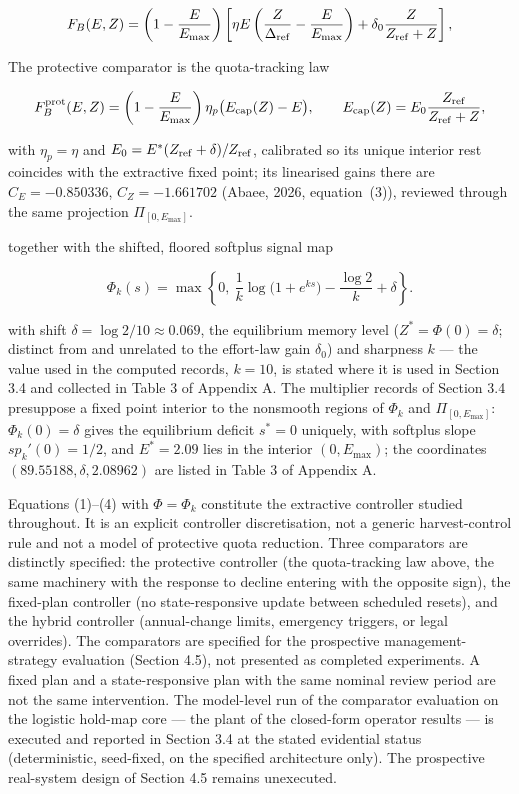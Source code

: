 \documentclass[11pt]{article}
\begin{document}
\[
F_B(E,Z)=\left(1-\frac{E}{E_{\max}}\right)
\left[
\eta E\left(\frac{Z}{\Delta_{\rm ref}}-\frac{E}{E_{\max}}\right)
+\delta_0\frac{Z}{Z_{\rm ref}+Z}
\right],
\]

The protective comparator is the quota-tracking law

\[
F_B^{\rm prot}(E,Z)=\left(1-\frac{E}{E_{\max}}\right)
\eta_p\bigl(E_{\rm cap}(Z)-E\bigr),
\qquad
E_{\rm cap}(Z)=E_0\frac{Z_{\rm ref}}{Z_{\rm ref}+Z},
\]

with \(\eta_p = \eta\) and \(E_0 = E^*(Z_{\rm ref}+\delta)/Z_{\rm ref}\), calibrated so its unique interior rest coincides with the extractive fixed point; its linearised gains there are \(C_E = -0.850336\), \(C_Z = -1.661702\) (Abaee, 2026, equation~(3)), reviewed through the same projection \(\Pi_{[0,E_{\max}]}\).

together with the shifted, floored softplus signal map

\[
\Phi_k(s)=\max\left\{0,\ \frac{1}{k}\log\!\bigl(1+e^{ks}\bigr)-\frac{\log 2}{k}+\delta\right\}.
\]

with shift \(\delta = \log 2/10 \approx 0.069\), the equilibrium memory level (\(Z^* = \Phi(0) = \delta\); distinct from
and unrelated to the effort-law gain \(\delta_0\)) and sharpness \(k\)
--- the value used in the computed records, \(k = 10\), is stated where it is used in Section 3.4 and collected in Table 3 of Appendix A. The
multiplier records of Section 3.4 presuppose a fixed point interior to
the nonsmooth regions of \(\Phi_k\) and \(\Pi_{[0,E_{\max}]}\):
\(\Phi_k(0) = \delta\) gives the equilibrium deficit \(s^* = 0\)
uniquely, with softplus slope \(sp_k'(0) = 1/2\), and \(E^* = 2.09\)
lies in the interior \((0, E_{\max})\); the coordinates
\((89.55188, \delta, 2.08962)\) are listed in Table 3 of Appendix A.

Equations (1)--(4) with \(\Phi=\Phi_k\) constitute the extractive
controller studied throughout. It is an explicit controller
discretisation, not a generic harvest-control rule and not a model of
protective quota reduction. Three comparators are distinctly specified: the protective controller (the quota-tracking law above, the same machinery with the
response to decline entering with the opposite sign), the fixed-plan
controller (no state-responsive update between scheduled resets), and
the hybrid controller (annual-change limits, emergency triggers, or
legal overrides). The comparators are specified for the prospective
management-strategy evaluation (Section 4.5), not presented as completed
experiments. A fixed plan and a state-responsive plan with the same
nominal review period are not the same intervention. The model-level run
of the comparator evaluation on the logistic hold-map core --- the plant
of the closed-form operator results --- is executed and reported in
Section 3.4 at the stated evidential status (deterministic,
seed-fixed, on the specified architecture only). The prospective
real-system design of Section 4.5 remains unexecuted.
\end{document}
